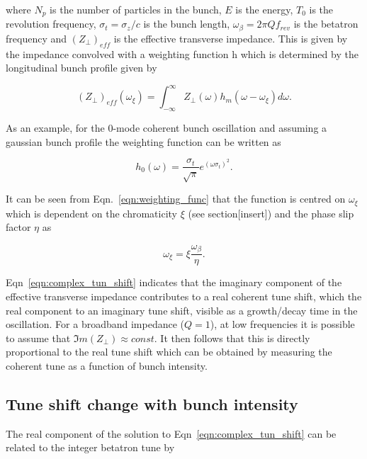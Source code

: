 where $N_{p}$ is the number of particles in the bunch, $E$ is the energy, $T_{0}$ is the revolution frequency, $\sigma_{t} = \sigma_{z}/c$ is the bunch length, $\omega_{\beta} = 2\pi{}Q f_{rev}$ is the betatron frequency and $\left( Z_{\perp} \right)_{eff}$ is the effective transverse impedance. This is given by the impedance convolved with a weighting function h which is determined by the longitudinal bunch profile given by

\begin{equation}
\left( Z_{\perp} \right)_{eff} \left( \omega_{\xi} \right) = \int_{-\infty}^{\infty} Z_{\perp} \left( \omega \right) h_{m} \left(  \omega - \omega_{\xi} \right) d\omega.
\end{equation}

As an example, for the 0-mode coherent bunch oscillation and assuming a gaussian bunch profile the weighting function can be written as

\begin{equation}
h_{0} \left( \omega \right) = \frac{\sigma_{t}}{\sqrt{\pi}}e^{ \left(  \omega \sigma_{t}  \right)^{2}}.
\label{eqn:weighting_func}
\end{equation}

It can be seen from Eqn.~\ref{eqn:weighting_func} that the function is centred on $\omega_{\xi}$ which is dependent on the chromaticity $\xi$ (see section[insert]) and the phase slip factor $\eta$ as

\begin{equation}
\omega_{\xi} = \xi \frac{\omega_{\beta}}{\eta}.
\end{equation}

Eqn~\ref{eqn:complex_tun_shift} indicates that the imaginary component of the effective transverse impedance contributes to a real coherent tune shift, which the real component to an imaginary tune shift, visible as a growth/decay time in the oscillation. For a broadband impedance ($Q=1$), at low frequencies it is possible to assume that $\Im{}m\left(  Z_{\perp} \right) \approx const.$ It then follows that this is directly proportional to the real tune shift which can be obtained by measuring the coherent tune as a function of bunch intensity.

\subsection{Tune shift change with bunch intensity}
\label{sec:tune-shift-bunch-int}

The real component of the solution to Eqn~\ref{eqn:complex_tun_shift} can be related to the integer betatron tune by


